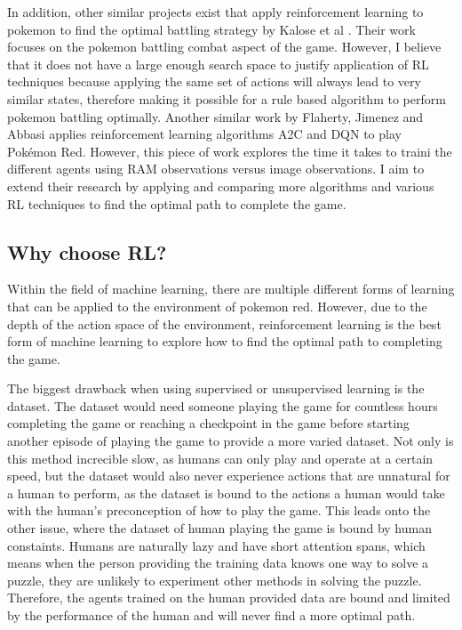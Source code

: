 In addition, other similar projects exist that apply reinforcement learning to pokemon to find the optimal battling strategy by Kalose et al \cite{kalose2018optimal}. 
Their work focuses on the pokemon battling combat aspect of the game. However, I believe that it does not have a large enough search space to justify application of RL techniques because applying the same set of actions will always lead to very similar states, therefore making it possible for a rule based algorithm to perform pokemon battling optimally. 
Another similar work by Flaherty, Jimenez and Abbasi \cite{flaherty2021playing} applies reinforcement learning algorithms A2C and DQN to play Pokémon Red. However, this piece of work explores the time it takes to traini the different agents using RAM observations versus image observations. I aim to extend their research by applying and comparing more algorithms and various RL techniques to find the optimal path to complete the game.

\subsection{Why choose RL?}

Within the field of machine learning, there are multiple different forms of learning that can be applied to the environment of pokemon red. However, due to the depth of the action space of the environment, reinforcement learning is the best form of machine learning to explore how to find the optimal path to completing the game. 

The biggest drawback when using supervised or unsupervised learning is the dataset. The dataset would need someone playing the game for countless hours completing the game or reaching a checkpoint in the game before starting another episode of playing the game to provide a more varied dataset. Not only is this method increcible slow, as humans can only play and operate at a certain speed, but the dataset would also never experience actions that are unnatural for a human to perform, as the dataset is bound to the actions a human would take with the human's preconception of how to play the game. This leads onto the other issue, where the dataset of human playing the game is bound by human constaints. Humans are naturally lazy and have short attention spans, which means when the person providing the training data knows one way to solve a puzzle, they are unlikely to experiment other methods in solving the puzzle. Therefore, the agents trained on the human provided data are bound and limited by the performance of the human and will never find a more optimal path. 

